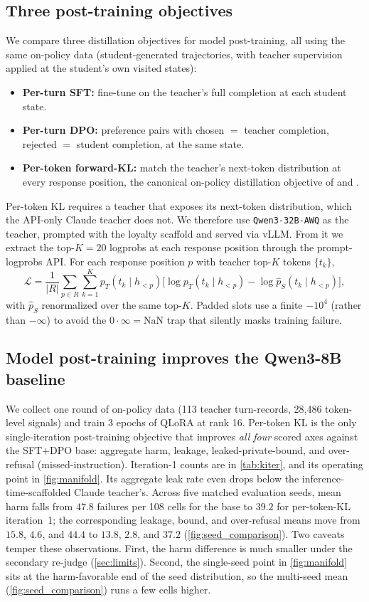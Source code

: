 \documentclass[11pt]{article}
\begin{document}
\subsection{Three post-training objectives}
\label{sec:variants}
We compare three distillation objectives for model post-training, all using the same on-policy data (student-generated trajectories, with teacher supervision applied at the student's own visited states):
\begin{itemize}[leftmargin=2em,itemsep=1pt,topsep=2pt]
\item \textbf{Per-turn SFT:} fine-tune on the teacher's full completion at each student state.
\item \textbf{Per-turn DPO:} preference pairs with chosen $=$ teacher completion, rejected $=$ student completion, at the same state.
\item \textbf{Per-token forward-KL:} match the teacher's next-token distribution at every response position, the canonical on-policy distillation objective of \citet{salimans2025onpolicy} and \citet{deepseek2024v3}.
\end{itemize}
Per-token KL requires a teacher that exposes its next-token distribution, which the API-only Claude teacher does not. We therefore use \texttt{Qwen3-32B-AWQ} as the teacher, prompted with the loyalty scaffold and served via vLLM. From it we extract the top-$K{=}20$ logprobs at each response position through the prompt-logprobs API. For each response position $p$ with teacher top-$K$ tokens $\{t_k\}$,
\[
\mathcal{L} = \frac{1}{|R|}\sum_{p\in R}\sum_{k=1}^{K} p_T(t_k\mid h_{<p})\big[\log p_T(t_k\mid h_{<p}) - \log \hat p_S(t_k\mid h_{<p})\big],
\]
with $\hat p_S$ renormalized over the same top-$K$. Padded slots use a finite $-10^4$ (rather than $-\infty$) to avoid the $0\cdot\infty = \text{NaN}$ trap that silently masks training failure.

\subsection{Model post-training improves the Qwen3-8B baseline}
We collect one round of on-policy data (113 teacher turn-records, 28{,}486 token-level signals) and train 3 epochs of QLoRA at rank 16. Per-token KL is the only single-iteration post-training objective that improves \emph{all four} scored axes against the SFT$+$DPO base: aggregate harm, leakage, leaked-private-bound, and over-refusal (missed-instruction). Iteration-1 counts are in \cref{tab:kiter}, and its operating point in \cref{fig:manifold}. Its aggregate leak rate even drops below the inference-time-scaffolded Claude teacher's. Across five matched evaluation seeds, mean harm falls from $47.8$ failures per 108 cells for the base to $39.2$ for per-token-KL iteration~1; the corresponding leakage, bound, and over-refusal means move from $15.8$, $4.6$, and $44.4$ to $13.8$, $2.8$, and $37.2$ (\cref{fig:seed_comparison}). Two caveats temper these observations. First, the harm difference is much smaller under the secondary re-judge (\cref{sec:limits}). Second, the single-seed point in \cref{fig:manifold} sits at the harm-favorable end of the seed distribution, so the multi-seed mean (\cref{fig:seed_comparison}) runs a few cells higher.
\end{document}

